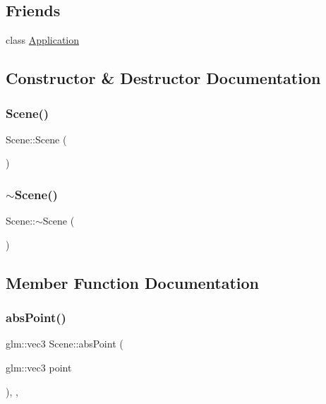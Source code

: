 \subsection*{Friends}
\begin{DoxyCompactItemize}
\item 
class \mbox{\hyperlink{classsage_1_1Scene_a23f25bcc02a0e94c2f5a4188496b04d0}{Application}}
\end{DoxyCompactItemize}


\subsection{Constructor \& Destructor Documentation}
\mbox{\label{classsage_1_1Scene_ad10176d75a9cc0da56626f682d083507}} 
\subsubsection{\texorpdfstring{Scene()}{Scene()}}
{\footnotesize\ttfamily Scene\+::\+Scene (\begin{DoxyParamCaption}{ }\end{DoxyParamCaption})}

\mbox{\label{classsage_1_1Scene_a3b8cec2e32546713915f8c6303c951f1}} 
\subsubsection{\texorpdfstring{$\sim$Scene()}{~Scene()}}
{\footnotesize\ttfamily Scene\+::$\sim$\+Scene (\begin{DoxyParamCaption}{ }\end{DoxyParamCaption})}



\subsection{Member Function Documentation}
\mbox{\label{classsage_1_1Scene_a7d445c207e9b3d978c8a47ceacd10b24}} 
\subsubsection{\texorpdfstring{absPoint()}{absPoint()}}
{\footnotesize\ttfamily glm\+::vec3 Scene\+::abs\+Point (\begin{DoxyParamCaption}\item[{glm\+::vec3}]{point }\end{DoxyParamCaption})\hspace{0.3cm}{\ttfamily [override]}, {\ttfamily [protected]}, {\ttfamily [virtual]}}



